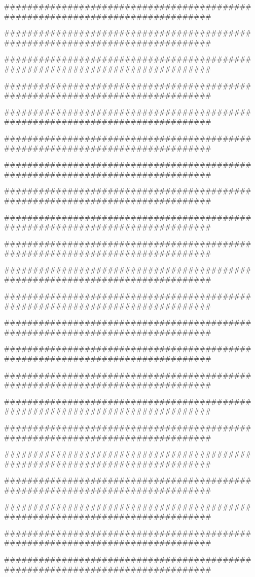 ###############################################################################

###############################################################################

###############################################################################

###############################################################################

###############################################################################

###############################################################################

###############################################################################

###############################################################################

###############################################################################

###############################################################################

###############################################################################

###############################################################################

###############################################################################

###############################################################################

###############################################################################

###############################################################################

###############################################################################

###############################################################################

###############################################################################

###############################################################################

###############################################################################

###############################################################################

